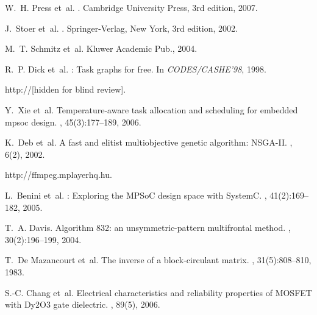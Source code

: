 \begin{thebibliography}{10}
W.~H. Press et~al.
.
\newblock Cambridge University Press, 3rd edition, 2007.

J.~Stoer et~al.
.
\newblock Springer-Verlag, New York, 3rd edition, 2002.

M.~T. Schmitz et~al.
\newblock Kluwer Academic Pub., 2004.

R.~P. Dick et~al.
: Task graphs for free.
\newblock In {\em CODES/CASHE'98}, 1998.

http://[hidden for blind review].

Y.~Xie et~al.
\newblock Temperature-aware task allocation and scheduling for embedded mpsoc
  design.
, 45(3):177--189, 2006.

K.~Deb et~al.
\newblock A fast and elitist multiobjective genetic algorithm: {NSGA-II}.
, 6(2), 2002.

http://ffmpeg.mplayerhq.hu.

L.~Benini et~al.
: Exploring the {MPSoC} design space with {SystemC}.
, 41(2):169--182,
  2005.

T.~A. Davis.
\newblock Algorithm 832: an unsymmetric-pattern multifrontal method.
, 30(2):196--199, 2004.

T.~De Mazancourt et~al.
\newblock The inverse of a block-circulant matrix.
, 31(5):808--810, 1983.

S.-C. Chang et~al.
\newblock Electrical characteristics and reliability properties of {MOSFET}
  with {Dy2O3} gate dielectric.
, 89(5), 2006.

\end{thebibliography}
